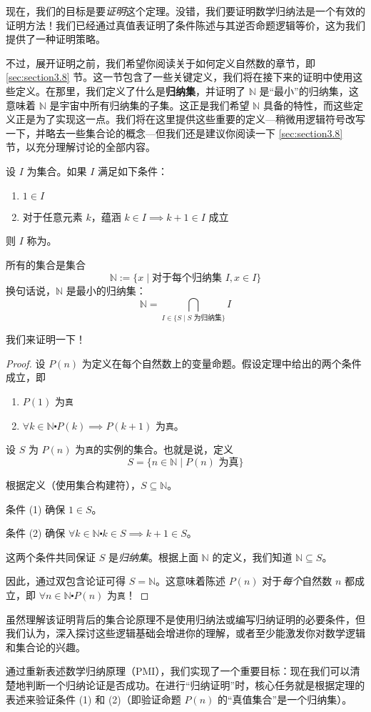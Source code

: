 现在，我们的目标是要\emph{证明}这个定理。没错，我们要证明数学归纳法是一个有效的证明方法！我们已经通过真值表证明了条件陈述与其逆否命题逻辑等价，这为我们提供了一种证明策略。

不过，展开证明之前，我们希望你阅读关于如何定义自然数的章节，即 \ref{sec:section3.8} 节。这一节包含了一些关键定义，我们将在接下来的证明中使用这些定义。在那里，我们定义了什么是\textbf{归纳集}，并证明了 $\mathbb{N}$ 是``最小''的归纳集，这意味着 $\mathbb{N}$ 是宇宙中所有归纳集的子集。这正是我们希望 $\mathbb{N}$ 具备的特性，而这些定义正是为了实现这一点。我们将在这里提供这些重要的定义---稍微用逻辑符号改写一下，并略去一些集合论的概念---但我们还是建议你阅读一下 \ref{sec:section3.8} 节，以充分理解讨论的全部内容。

\begin{definition}
    设 $I$ 为集合。如果 $I$ 满足如下条件：
    \begin{enumerate}
        \item $1 \in I$
        \item 对于任意元素 $k$，蕴涵 $k \in I \implies k + 1 \in I$ 成立
    \end{enumerate}
    则 $I$ 称为。
\end{definition}

\begin{definition}
    所有的集合是集合
    \[\mathbb{N}:=\{x \mid \text{对于每个归纳集 }I, x \in I\}\]
    换句话说，$\mathbb{N}$ 是最小的归纳集：
    \[\mathbb{N} = \bigcap_{I \in \{S \mid S \text{ 为归纳集}\}} I\] 
\end{definition}

我们来证明一下！

\begin{proof}
    设 $P(n)$ 为定义在每个自然数上的变量命题。假设定理中给出的两个条件成立，即
    \begin{enumerate}[label=(\arabic*)]
        \item $P(1)$ 为\verb|真|
        \item $\forall k \in \mathbb{N} \centerdot P(k) \implies P(k+1)$ 为\verb|真|。
    \end{enumerate}

    设 $S$ 为 $P(n)$ 为\verb|真|的实例的集合。也就是说，定义
    \[S = \{n \in \mathbb{N} \mid P(n) \text{ 为真}\}\]

    根据定义（使用集合构建符），$S \subseteq \mathbb{N}$。

    条件 (1) 确保 $1 \in S$。

    条件 (2) 确保 $\forall k \in \mathbb{N} \centerdot k \in S \implies k+1 \in S$。

    这两个条件共同保证 $S$ 是\emph{归纳集}。根据上面 $\mathbb{N}$ 的定义，我们知道 $\mathbb{N} \subseteq S$。

    因此，通过双包含论证可得 $S = \mathbb{N}$。这意味着陈述 $P(n)$ 对于\emph{每个}自然数 $n$ 都成立，即 $\forall n \in \mathbb{N} \centerdot P(n)$ 为\verb|真|！
\end{proof}

虽然理解该证明背后的集合论原理不是使用归纳法或编写归纳证明的必要条件，但我们认为，深入探讨这些逻辑基础会增进你的理解，或者至少能激发你对数学逻辑和集合论的兴趣。

通过重新表述数学归纳原理（PMI），我们实现了一个重要目标：现在我们可以清楚地判断一个归纳论证是否成功。在进行``归纳证明''时，核心任务就是根据定理的表述来验证条件 (1) 和 (2)（即验证命题 $P(n)$ 的``真值集合''是一个归纳集）。
